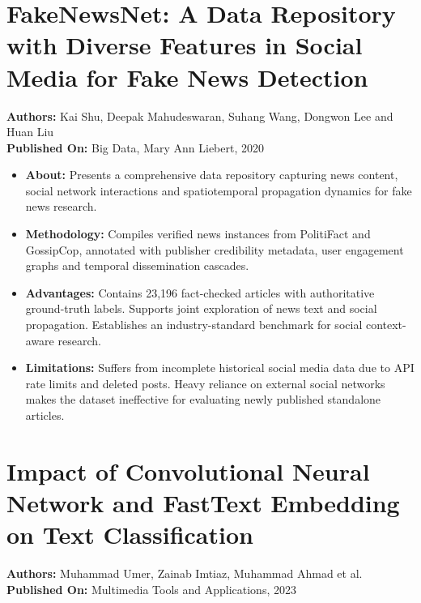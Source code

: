 \documentclass[12pt,a4paper,oneside]{report}
\begin{document}
\section{FakeNewsNet: A Data Repository with Diverse Features in Social Media for Fake News Detection}
\textbf{Authors:} Kai Shu, Deepak Mahudeswaran, Suhang Wang, Dongwon Lee and Huan Liu\\
\textbf{Published On:} Big Data, Mary Ann Liebert, 2020

\begin{itemize}[leftmargin=*, itemsep=2pt]
  \item \textbf{About:} Presents a comprehensive data repository capturing news content,
        social network interactions and spatiotemporal propagation dynamics for fake news
        research.
  \item \textbf{Methodology:} Compiles verified news instances from PolitiFact and
        GossipCop, annotated with publisher credibility metadata, user engagement graphs
        and temporal dissemination cascades.
  \item \textbf{Advantages:} Contains 23,196 fact-checked articles with authoritative
        ground-truth labels. Supports joint exploration of news text and social
        propagation. Establishes an industry-standard benchmark for social context-aware
        research.
  \item \textbf{Limitations:} Suffers from incomplete historical social media data due
        to API rate limits and deleted posts. Heavy reliance on external social networks
        makes the dataset ineffective for evaluating newly published standalone
        articles.
\end{itemize}

\section{Impact of Convolutional Neural Network and FastText Embedding on Text Classification}
\textbf{Authors:} Muhammad Umer, Zainab Imtiaz, Muhammad Ahmad et al.\\
\textbf{Published On:} Multimedia Tools and Applications, 2023
\end{document}

